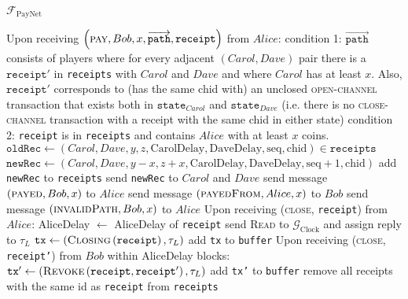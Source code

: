 \begin{functionality}{$\mathcal{F}_{\mathrm{PayNet}}$}
\begin{algorithmic}[1]
      \EndIf
    \EndIndent
    \State {}
    \State {}
    \State Upon receiving $\left(\textsc{pay}, Bob, x,
    \overrightarrow{\mathtt{path}}, \mathtt{receipt}\right)$ from $Alice$:
    \Indent
      \State condition 1: $\overrightarrow{\mathtt{path}}$ consists of players
      where for every adjacent $\left(Carol, Dave\right)$ pair there is a
      $\mathtt{receipt}'$ in \texttt{receipts} with $Carol$ and $Dave$ and where
      $Carol$ has at least $x$. Also, $\mathtt{receipt}'$ corresponds to (has
      the same chid with) an unclosed \textsc{open-channel} transaction that
      exists both in $\mathtt{state}_{Carol}$ and $\mathtt{state}_{Dave}$ (i.e.
      there is no \textsc{close-channel} transaction with a receipt with the
      same chid in either state)
      \State condition 2: \texttt{receipt} is in \texttt{receipts} and contains
      $Alice$ with at least $x$ coins.
          \State $\mathtt{oldRec} \gets \left(Carol, Dave, y, z,
          \mathrm{CarolDelay}, \mathrm{DaveDelay}, \mathrm{seq},
          \mathrm{chid}\right) \in \mathtt{receipts}$
          \State $\mathtt{newRec} \gets \left(Carol, Dave, y - x, z + x,
          \mathrm{CarolDelay}, \mathrm{DaveDelay}, \mathrm{seq} + 1,
          \mathrm{chid}\right)$
          \State add \texttt{newRec} to \texttt{receipts}
          \State send \texttt{newRec} to $Carol$ and $Dave$
        \EndFor
        \State send message $\left(\textsc{payed}, Bob, x\right)$ to $Alice$
        \State send message $\left(\textsc{payedFrom}, Alice, x\right)$ to $Bob$
      \Else
        \State send message $\left(\textsc{invalidPath}, Bob, x\right)$ to
        $Alice$
      \EndIf
    \EndIndent
    \State
    \State Upon receiving (\textsc{close}, \texttt{receipt}) from $Alice$:
    \Indent
        \State AliceDelay $\gets$ AliceDelay of \texttt{receipt}
        \State send \textsc{Read} to $\mathcal{G}_{\mathrm{Clock}}$ and assign
        reply to $\tau_L$
        \State $\mathtt{tx} \gets
        \left(\textsc{Closing}\left(\mathtt{receipt}\right), \tau_L\right)$
        \State add \texttt{tx} to \texttt{buffer}
        \State Upon receiving (\textsc{close}, \texttt{receipt'}) from $Bob$
        within AliceDelay blocks:
          \State $\mathtt{tx'} \gets
          \left(\textsc{Revoke}\left(\mathtt{receipt}, \mathtt{receipt'}\right),
          \tau_L\right)$
          \State add \texttt{tx'} to \texttt{buffer} 
        \EndIf
        \State remove all receipts with the same id as \texttt{receipt} from
        \texttt{receipts}
      \EndIf
    \EndIndent
  \end{algorithmic}
\end{functionality}
